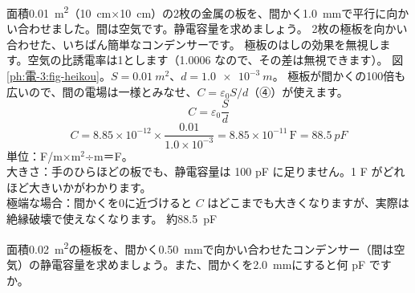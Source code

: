 {}
{}

\label{ph:電-3:ex1}
\begin{phreidai}[平行板コンデンサーの静電容量]
面積\qty{0.01}{m^2}（\qty{10}{cm}×\qty{10}{cm}）の2枚の金属の板を、間かく\qty{1.0}{mm}で平行に向かい合わせました。間は空気です。静電容量を求めましょう。
\phbamen
2枚の極板を向かい合わせた、いちばん簡単なコンデンサーです。
\phmushi
極板のはしの効果を無視します。空気の比誘電率は1とします（1.0006 なので、その差は無視できます）。
\phzu
図\ref{ph:電-3:fig-heikou}。$S=\qty{0.01}{m^2}$、$d=\qty{1.0e-3}{m}$。
\phriyu
極板が間かくの100倍も広いので、間の電場は一様とみなせ、$C=\varepsilon_0S/d$（④）が使えます。
\phtateru
\[C=\varepsilon_0\frac{S}{d}\]
\phtoku
\[C=8.85\times10^{-12}\times\frac{0.01}{1.0\times10^{-3}}=8.85\times10^{-11}\,\text{F}=\qty{88.5}{pF}\]
\phtashikame
単位：F/m×m$^2$÷m＝F。\\
大きさ：手のひらほどの板でも、静電容量は 100 pF に足りません。1 F がどれほど大きいかがわかります。\\
極端な場合：間かくを0に近づけると $C$ はどこまでも大きくなりますが、実際は絶縁破壊で使えなくなります。
\kotae 約\qty{88.5}{pF}
\end{phreidai}
\begin{jibun}
面積\qty{0.02}{m^2}の極板を、間かく\qty{0.50}{mm}で向かい合わせたコンデンサー（間は空気）の静電容量を求めましょう。また、間かくを\qty{2.0}{mm}にすると何 pF ですか。
\end{jibun}

